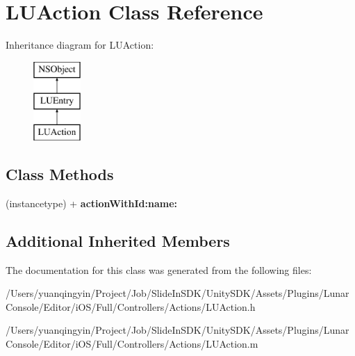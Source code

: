 \hypertarget{interface_l_u_action}{}\section{L\+U\+Action Class Reference}
\label{interface_l_u_action}
Inheritance diagram for L\+U\+Action\+:\begin{figure}[H]
\begin{center}
\leavevmode
\includegraphics[height=3.000000cm]{interface_l_u_action}
\end{center}
\end{figure}
\subsection*{Class Methods}
\begin{DoxyCompactItemize}
\item 
\mbox{\label{interface_l_u_action_a5eda293bd5d754a14f02e135826831cd}} 
(instancetype) + {\bfseries action\+With\+Id\+:name\+:}
\end{DoxyCompactItemize}
\subsection*{Additional Inherited Members}


The documentation for this class was generated from the following files\+:\begin{DoxyCompactItemize}
\item 
/\+Users/yuanqingyin/\+Project/\+Job/\+Slide\+In\+S\+D\+K/\+Unity\+S\+D\+K/\+Assets/\+Plugins/\+Lunar\+Console/\+Editor/i\+O\+S/\+Full/\+Controllers/\+Actions/L\+U\+Action.\+h\item 
/\+Users/yuanqingyin/\+Project/\+Job/\+Slide\+In\+S\+D\+K/\+Unity\+S\+D\+K/\+Assets/\+Plugins/\+Lunar\+Console/\+Editor/i\+O\+S/\+Full/\+Controllers/\+Actions/L\+U\+Action.\+m\end{DoxyCompactItemize}
